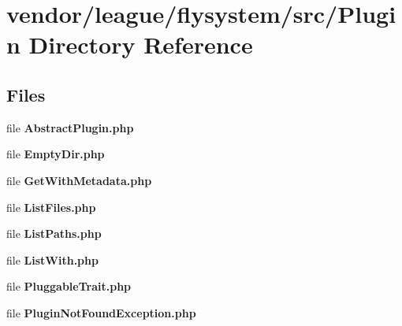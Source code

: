 \section{vendor/league/flysystem/src/\+Plugin Directory Reference}
\label{dir_cdfc68badcd2f81617fa255e9305ef2c}
\subsection*{Files}
\begin{DoxyCompactItemize}
\item 
file {\bf Abstract\+Plugin.\+php}
\item 
file {\bf Empty\+Dir.\+php}
\item 
file {\bf Get\+With\+Metadata.\+php}
\item 
file {\bf List\+Files.\+php}
\item 
file {\bf List\+Paths.\+php}
\item 
file {\bf List\+With.\+php}
\item 
file {\bf Pluggable\+Trait.\+php}
\item 
file {\bf Plugin\+Not\+Found\+Exception.\+php}
\end{DoxyCompactItemize}
